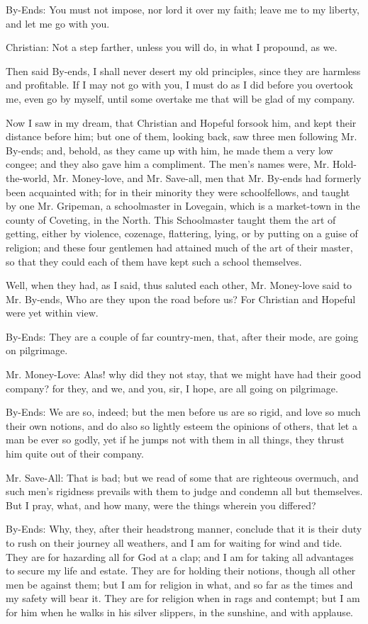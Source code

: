 By-Ends: You must not impose, nor lord it over my faith; leave me to my liberty, and let me go with you.

Christian: Not a step farther, unless you will do, in what I propound, as we.

Then said By-ends, I shall never desert my old principles, since they are harmless and profitable. If I may not go with you, I must do as I did before you overtook me, even go by myself, until some overtake me that will be glad of my company.

Now I saw in my dream, that Christian and Hopeful forsook him, and kept their distance before him; but one of them, looking back, saw three men following Mr. By-ends; and, behold, as they came up with him, he made them a very low congee; and they also gave him a compliment. The men's names were, Mr. Hold-the-world, Mr. Money-love, and Mr. Save-all, men that Mr. By-ends had formerly been acquainted with; for in their minority they were schoolfellows, and taught by one Mr. Gripeman, a schoolmaster in Lovegain, which is a market-town in the county of Coveting, in the North. This Schoolmaster taught them the art of getting, either by violence, cozenage, flattering, lying, or by putting on a guise of religion; and these four gentlemen had attained much of the art of their master, so that they could each of them have kept such a school themselves.

Well, when they had, as I said, thus saluted each other, Mr. Money-love said to Mr. By-ends, Who are they upon the road before us? For Christian and Hopeful were yet within view.

By-Ends: They are a couple of far country-men, that, after their mode, are going on pilgrimage.

Mr. Money-Love: Alas! why did they not stay, that we might have had their good company? for they, and we, and you, sir, I hope, are all going on pilgrimage.

By-Ends: We are so, indeed; but the men before us are so rigid, and love so much their own notions, and do also so lightly esteem the opinions of others, that let a man be ever so godly, yet if he jumps not with them in all things, they thrust him quite out of their company.

Mr. Save-All: That is bad; but we read of some that are righteous overmuch, and such men's rigidness prevails with them to judge and condemn all but themselves. But I pray, what, and how many, were the things wherein you differed?

By-Ends: Why, they, after their headstrong manner, conclude that it is their duty to rush on their journey all weathers, and I am for waiting for wind and tide. They are for hazarding all for God at a clap; and I am for taking all advantages to secure my life and estate. They are for holding their notions, though all other men be against them; but I am for religion in what, and so far as the times and my safety will bear it. They are for religion when in rags and contempt; but I am for him when he walks in his silver slippers, in the sunshine, and with applause.

